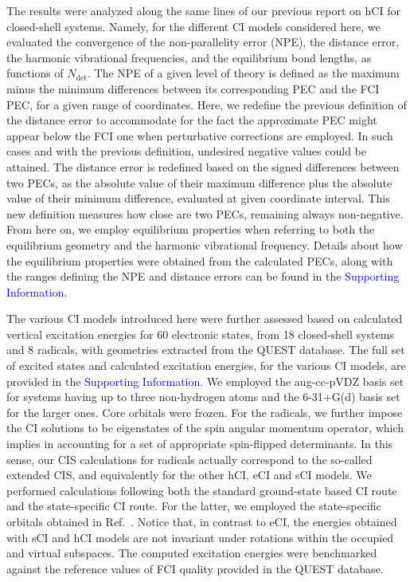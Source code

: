 \documentclass[aip,jcp,reprint,noshowkeys,superscriptaddress]{revtex4-1}
\newcommand{\SupInf}{\textcolor{blue}{Supporting Information}}
\newcommand{\Ndet}{N_\text{det}}
\begin{document}
The results were analyzed along the same lines of our previous report on hCI for closed-shell systems. \cite{Kossoski_2022}
Namely, for the different CI models considered here, 
we evaluated the convergence of the non-parallelity error (NPE), the distance error, the harmonic vibrational frequencies, and the equilibrium bond lengths, as functions of $\Ndet$.
The NPE of a given level of theory is defined as the maximum minus the minimum differences between its corresponding PEC and the FCI PEC, for a given range of coordinates.
Here, we redefine the previous definition of the distance error \cite{Kossoski_2022} to accommodate for the fact the approximate PEC might appear below the FCI one when perturbative corrections are employed.
In such cases and with the previous definition, undesired negative values could be attained.
The distance error is redefined based on the signed differences between two PECs, as the absolute value of their maximum difference plus the absolute value of their minimum difference, 
evaluated at given coordinate interval.
This new definition measures how close are two PECs, remaining always non-negative.
From here on, we employ equilibrium properties when referring to both the equilibrium geometry and the harmonic vibrational frequency.
Details about how the equilibrium properties were obtained from the calculated PECs,
along with the ranges defining the NPE and distance errors can be found in the \SupInf.

The various CI models introduced here were further assessed based on calculated vertical excitation energies for 60 electronic states,
from 18 closed-shell systems and 8 radicals, with geometries extracted from the QUEST database. \cite{Veril_2021}
The full set of excited states and calculated excitation energies, for the various CI models, are provided in the {\SupInf}.
We employed the aug-cc-pVDZ basis set for systems having up to three non-hydrogen atoms and the 6-31+G(d) basis set for the larger ones.
Core orbitals were frozen.
For the radicals, we further impose the CI solutions to be eigenstates of the spin angular momentum operator, which implies in accounting for a set of appropriate spin-flipped determinants.
In this sense, our CIS calculations for radicals actually correspond to the so-called extended CIS, \cite{Maurice_1996} and equivalently for the other hCI, eCI and sCI models.
We performed calculations following both the standard ground-state based CI route and the state-specific CI route. \cite{Kossoski_2023}
For the latter, we employed the state-specific orbitals obtained in Ref.~.
Notice that, in contrast to eCI, the energies obtained with sCI and hCI models are not invariant under rotations within the occupied and virtual subspaces.
The computed excitation energies were benchmarked against the reference values of FCI quality provided in the QUEST database. \cite{Veril_2021}
\end{document}
